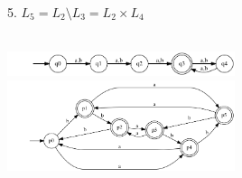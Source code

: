 \documentclass{article}
\begin{document}
\begin{enumerate}
5. $L_5 = L_2 \setminus L_3 = L_2 \times L_4 $ \\ \\
    \begin{center}
        \includegraphics[width=0.5\textwidth]{g251.png}
        \includegraphics[width=0.5\textwidth]{g252.png}
    \end{center}
    

\end{enumerate}
\end{document}
